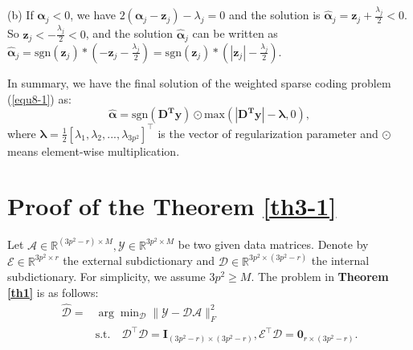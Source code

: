 (b) If $\bm{\alpha}_{j}< 0$, we have
$
2(\bm{\alpha}_{j}-\bm{z}_{j})-\lambda_{j}=0
$
and the solution is
$
\hat{\bm{\alpha}}_{j}=\bm{z}_{j}+\frac{\lambda_{j}}{2} < 0.
$
So $\bm{z}_{j}<-\frac{\lambda_{j}}{2}< 0$, and the solution $\hat{\bm{\alpha}}_{j}$ can be written as
$
\hat{\bm{\alpha}}_{j}=\text{sgn}(\bm{z}_{j})*(-\bm{z}_{j}-\frac{\lambda_{j}}{2})=\text{sgn}(\bm{z}_{j})*(|\bm{z}_{j}|-\frac{\lambda_{j}}{2}).
$

In summary, we have the final solution of the weighted sparse coding problem (\ref{equ8-1}) as:
\begin{equation}
\label{equ8-5}
\hat{\bm{\alpha}}= \text{sgn}(\bm{D^{T}y})\odot \text{max}(|\bm{D^{T}y}|-\bm{\lambda},0),
\end{equation}
where $\bm{\lambda} = \frac{1}{2}[\lambda_{1},\lambda_{2},...,\lambda_{3p^2}]^{\top}$ is the vector of regularization parameter and $\odot$ means element-wise multiplication.

\section{Proof of the Theorem \ref{th3-1}}

Let $\mathcal{A}\in \mathbb{R}^{(3p^2-r)\times M},\mathcal{Y}\in \mathbb{R}^{3p^2\times M}$ be two given data matrices. Denote by $\mathcal{E}\in\mathbb{R}^{3p^2\times r}$ the external subdictionary and $\mathcal{D}\in\mathbb{R}^{3p^2\times (3p^2-r)}$ the internal subdictionary. For simplicity, we assume $3p^2\ge M$. The problem in \textbf{Theorem \ref{th1}} is as follows:
\begin{equation}
\label{equ8-6}
\begin{split}
\hat{\mathcal{D}}
=
&
\arg\min\nolimits_{\mathcal{D}}\|\mathcal{Y}-\mathcal{D}\mathcal{A}\|_{F}^{2}
\\
&
\text{s.t.}
\quad
\mathcal{D}^{\top}\mathcal{D} = \bm{I}_{(3p^2-r)\times (3p^2-r)}, \mathcal{E}^{\top}\mathcal{D} = \bm{0}_{r\times (3p^2-r)}.
\end{split}
\end{equation} 

